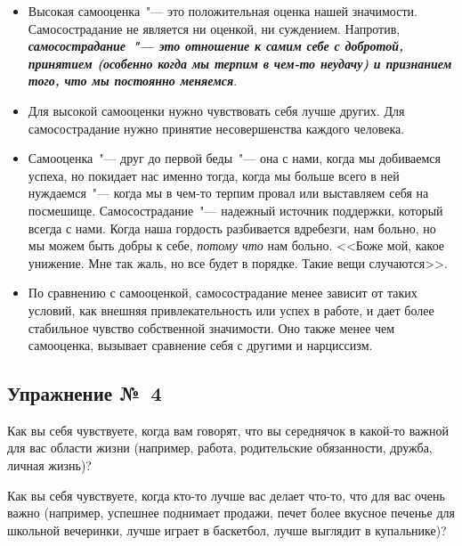 \begin{itemize}
	\item Высокая самооценка~"--- это положительная оценка нашей значимости. Самосострадание не является ни оценкой, ни суждением. Напротив, \textbf{\textit{самосострадание~"--- это отношение к самим себе с добротой, принятием (особенно когда мы терпим в чем-то неудачу) и признанием того, что мы постоянно меняемся}}.
	\item Для высокой самооценки нужно чувствовать себя лучше других. Для самосострадание нужно принятие несовершенства каждого человека.
	\item Самооценка~"--- друг до первой беды~"--- она с нами, когда мы добиваемся успеха, но покидает нас именно тогда, когда мы больше всего в ней нуждаемся~"--- когда мы в чем-то терпим провал или выставляем себя на посмешище. Самосострадание~"--- надежный источник поддержки, который всегда с нами. Когда наша гордость разбивается вдребезги, нам больно, но мы можем быть добры к себе, \emph{потому что} нам больно. <<Боже мой, какое унижение. Мне так жаль, но все будет в порядке. Такие вещи случаются>>.
	\item По сравнению с самооценкой, самосострадание менее зависит от таких условий, как внешняя привлекательность или успех в работе, и дает более стабильное чувство собственной значимости. Оно также менее чем самооценка, вызывает сравнение себя с другими и нарциссизм.
\end{itemize}

\newpage

\subsection{Упражнение №~4}


\vspace{3ex}

Как вы себя чувствуете, когда вам говорят, что вы середнячок в какой-то важной для вас области жизни (например, работа, родительские обязанности, дружба, личная жизнь)?

\vfill

Как вы себя чувствуете, когда кто-то лучше вас делает что-то, что для вас очень важно (например, успешнее поднимает продажи, печет более вкусное печенье для школьной вечеринки, лучше играет в баскетбол, лучше выглядит в купальнике)?

\vfill


